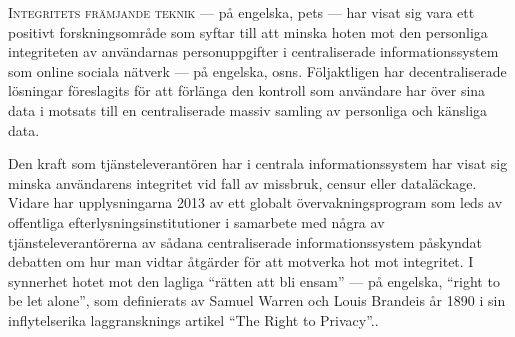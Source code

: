 


    {

    \lettrine{\textcolor[gray]{.25}{I}}{ntegritets främjande teknik}\csname@restorepar\endcsname\everypar{} 
    --- på engelska, \aclp*{pet} --- har visat sig vara ett positivt forskningsområde 
    som syftar till att minska hoten mot den personliga integriteten av användarnas 
    personuppgifter i centraliserade informationssystem som online sociala nätverk 
    --- på engelska, \aclp*{osn}. Följaktligen har decentraliserade lösningar föreslagits 
    för att förlänga den kontroll som användare har över sina data i motsats till 
    en centraliserade massiv samling av personliga och känsliga data.\par
    }
    
    Den kraft som tjänsteleverantören har i centrala informationssystem har visat 
    sig minska användarens integritet vid fall av missbruk, censur eller dataläckage. 
    Vidare har upplysningarna 2013 av ett globalt övervakningsprogram som leds av 
    offentliga efterlysningsinstitutioner i samarbete med några av tjänsteleverantörerna 
    av sådana centraliserade informationssystem påskyndat debatten om hur man vidtar 
    åtgärder för att motverka hot mot integritet. I synnerhet hotet mot den lagliga 
    ``rätten att bli ensam'' --- på engelska, ``right to be let alone'', som definierats 
    av Samuel Warren och Louis Brandeis år 1890 i sin inflytelserika laggransknings 
    artikel ``The Right to Privacy''..
    
